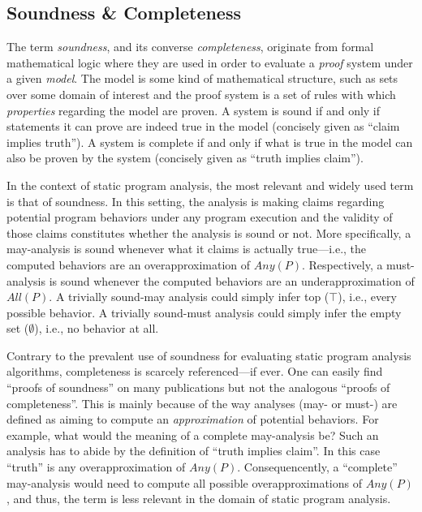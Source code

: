 \subsection{Soundness \& Completeness}

The term \emph{soundness}, and its converse \emph{completeness}, originate from
formal mathematical logic where they are used in order to evaluate a \emph{proof}
system under a given \emph{model}. The model is some kind of mathematical
structure, such as sets over some domain of interest and the proof system is a
set of rules with which \emph{properties} regarding the model are proven. A
system is sound if and only if statements it can prove are indeed true in the
model (concisely given as ``claim implies truth''). A system is complete if and
only if what is true in the model can also be proven by the system (concisely
given as ``truth implies claim'').

In the context of static program analysis, the most relevant and widely used
term is that of soundness. In this setting, the analysis is making claims
regarding potential program behaviors under any program execution and the
validity of those claims constitutes whether the analysis is sound or not. More
specifically, a may-analysis is sound whenever what it claims is actually
true---i.e., the computed behaviors are an overapproximation of $Any(P)$.
Respectively, a must-analysis is sound whenever the computed behaviors are an
underapproximation of $All(P)$. A trivially sound-may analysis could simply
infer top ($\top$), i.e., every possible behavior. A trivially sound-must
analysis could simply infer the empty set ($\emptyset$), i.e., no behavior at
all.

Contrary to the prevalent use of soundness for evaluating static program
analysis algorithms, completeness is scarcely referenced---if ever. One can
easily find ``proofs of soundness'' on many publications but not the analogous
``proofs of completeness''. This is mainly because of the way analyses (may- or
must-) are defined as aiming to compute an \emph{approximation} of potential
behaviors. For example, what would the meaning of a complete may-analysis be?
Such an analysis has to abide by the definition of ``truth implies claim''. In
this case ``truth'' is any overapproximation of $Any(P)$. Consequencently, a
``complete'' may-analysis would need to compute all possible overapproximations
of $Any(P)$, and thus, the term is less relevant in the domain of static
program analysis.

